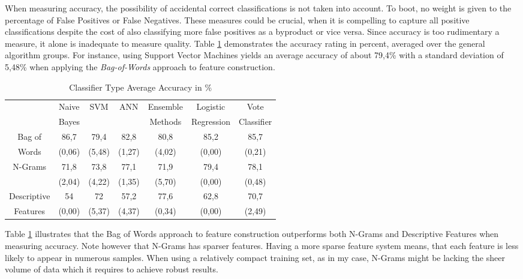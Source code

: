 			\par
			When measuring accuracy, the possibility of accidental correct classifications is not taken into account. To boot, no weight is given to the percentage of False Positives or False Negatives. These measures could be crucial, when it is compelling to capture all positive classifications despite the cost of also classifying more false positives as a byproduct or vice versa. Since accuracy is too rudimentary a measure, it alone is inadequate to measure quality. Table \ref{tab:accuracy} demonstrates the accuracy rating in percent, averaged over the general algorithm groups. For instance, using Support Vector Machines yields an average accuracy of about 79,4\% with a standard deviation of 5,48\% when applying the \textit{Bag-of-Words} approach to feature construction.
			
			\par
			
			\begin{table}[H]
				\centering
				\begin{tabular}{c|cccccc}
					\hline\hline\vspace*{-2mm}
											 & Naive & \multirow{2}{*}{SVM} & \multirow{2}{*}{ANN} & Ensemble & Logistic 	 & Vote \\
											 & Bayes & 					 	&       			   & Methods  & Regression 	 & Classifier \\
					\hline
					Bag of					 & 86,7   & 79,4   & 82,8   & 80,8 	 & 85,2   & 85,7  \\
					Words					 & (0,06) & (5,48) & (1,27) & (4,02) & (0,00) & (0,21) \\
					\hline
					\multirow{2}{*}{N-Grams} & 71,8   & 73,8   & 77,1 	& 71,9 	 & 79,4   & 78,1 \\
											 & (2,04) & (4,22) & (1,35) & (5,70) & (0,00) & (0,48)\\	
					\hline
					Descriptive				 & 54 	  & 72 	   & 57,2   & 77,6   & 62,8   &  70,7\\
					Features 				 & (0,00) & (5,37) & (4,37) & (0,34) & (0,00) & (2,49)\\	
					\hline\hline				
				\end{tabular}
				\captionsetup{width=0.8\textwidth}
				\caption{Classifier Type Average Accuracy in \%}
				\label{tab:accuracy}%
			\end{table}%
		
		Table \ref{tab:accuracy} illustrates that the Bag of Words approach to feature construction outperforms both N-Grams and Descriptive Features when measuring accuracy. Note however that N-Grams has sparser features. Having a more sparse feature system means, that each feature is less likely to appear in numerous samples. When using a relatively compact training set, as in my case, N-Grams might be lacking the sheer volume of data which it requires to achieve robust results.
		
